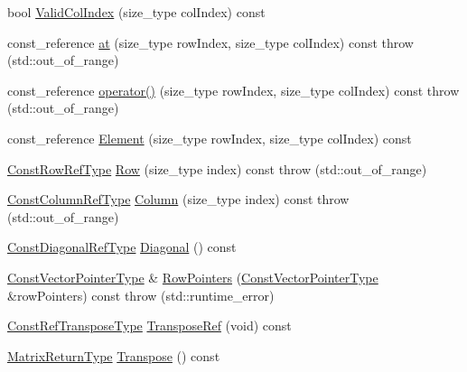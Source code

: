 \begin{DoxyCompactItemize}
bool \hyperlink{classvct_dynamic_const_matrix_base_a054af49cd467727fe8f007d5ed4f0a48}{Valid\+Col\+Index} (size\+\_\+type col\+Index) const 
\item 
const\+\_\+reference \hyperlink{classvct_dynamic_const_matrix_base_a92b4ca4dab487ba7b7f67f1db6e3088f}{at} (size\+\_\+type row\+Index, size\+\_\+type col\+Index) const   throw (std\+::out\+\_\+of\+\_\+range)
\item 
const\+\_\+reference \hyperlink{classvct_dynamic_const_matrix_base_a13173200e9010fad7fa40424a9029071}{operator()} (size\+\_\+type row\+Index, size\+\_\+type col\+Index) const   throw (std\+::out\+\_\+of\+\_\+range)
\item 
const\+\_\+reference \hyperlink{classvct_dynamic_const_matrix_base_a1edb144a06a217e0a800e5de3dd36ab0}{Element} (size\+\_\+type row\+Index, size\+\_\+type col\+Index) const 
\item 
\hyperlink{classvct_dynamic_const_matrix_base_a42a300cb1afd5f0602ba5c2d7d9cc40b}{Const\+Row\+Ref\+Type} \hyperlink{classvct_dynamic_const_matrix_base_a0e6facb1bfd8784e96f0fed8f801f8d0}{Row} (size\+\_\+type index) const   throw (std\+::out\+\_\+of\+\_\+range)
\item 
\hyperlink{classvct_dynamic_const_matrix_base_ac8caf37f979246b1ae99d6e6876879e0}{Const\+Column\+Ref\+Type} \hyperlink{classvct_dynamic_const_matrix_base_a22bac424f1d0acfe10648a2472dfe622}{Column} (size\+\_\+type index) const   throw (std\+::out\+\_\+of\+\_\+range)
\item 
\hyperlink{classvct_dynamic_const_matrix_base_aa497314340719c9e70a4991d3f306d7e}{Const\+Diagonal\+Ref\+Type} \hyperlink{classvct_dynamic_const_matrix_base_ab6946fa750833010b3a72af220c78002}{Diagonal} () const 
\item 
\hyperlink{classvct_dynamic_const_matrix_base_ae4eb1369d9d05fdf98786c5583834e73}{Const\+Vector\+Pointer\+Type} \& \hyperlink{classvct_dynamic_const_matrix_base_a5ff8d15f4a32e893a3ebe8cb13f6c732}{Row\+Pointers} (\hyperlink{classvct_dynamic_const_matrix_base_ae4eb1369d9d05fdf98786c5583834e73}{Const\+Vector\+Pointer\+Type} \&row\+Pointers) const   throw (std\+::runtime\+\_\+error)
\item 
\hyperlink{classvct_dynamic_const_matrix_base_a2ee053ef5a591f470076e2a0c215fa44}{Const\+Ref\+Transpose\+Type} \hyperlink{classvct_dynamic_const_matrix_base_ae3e84ae1226f2711bcc5bcf03497ecc0}{Transpose\+Ref} (void) const 
\item 
\hyperlink{classvct_dynamic_const_matrix_base_aed2ac5b2cf673fab97a67418f8e69646}{Matrix\+Return\+Type} \hyperlink{classvct_dynamic_const_matrix_base_a8e74c50a0cc8f228a89287b82218e2fd}{Transpose} () const 

\end{DoxyCompactItemize}
